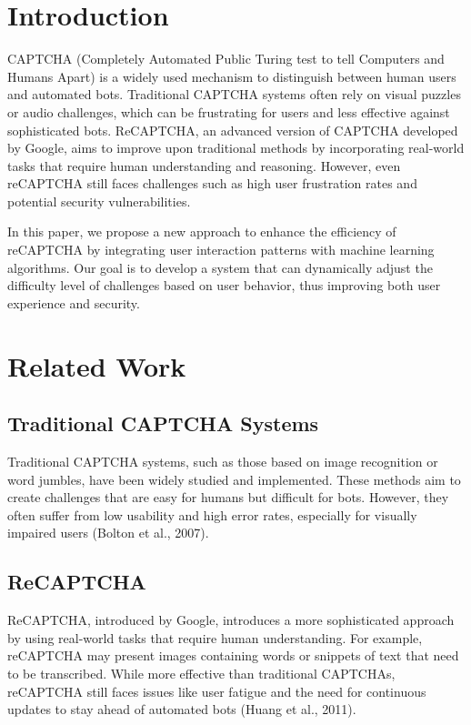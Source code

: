\section{Introduction}
\label{sec:introduction}
CAPTCHA (Completely Automated Public Turing test to tell Computers and Humans Apart) is a widely used mechanism to distinguish between human users and automated bots. Traditional CAPTCHA systems often rely on visual puzzles or audio challenges, which can be frustrating for users and less effective against sophisticated bots. ReCAPTCHA, an advanced version of CAPTCHA developed by Google, aims to improve upon traditional methods by incorporating real-world tasks that require human understanding and reasoning. However, even reCAPTCHA still faces challenges such as high user frustration rates and potential security vulnerabilities.

In this paper, we propose a new approach to enhance the efficiency of reCAPTCHA by integrating user interaction patterns with machine learning algorithms. Our goal is to develop a system that can dynamically adjust the difficulty level of challenges based on user behavior, thus improving both user experience and security.

\section{Related Work}
\label{sec:related_work}
\subsection{Traditional CAPTCHA Systems}
Traditional CAPTCHA systems, such as those based on image recognition or word jumbles, have been widely studied and implemented. These methods aim to create challenges that are easy for humans but difficult for bots. However, they often suffer from low usability and high error rates, especially for visually impaired users (Bolton et al., 2007).

\subsection{ReCAPTCHA}
ReCAPTCHA, introduced by Google, introduces a more sophisticated approach by using real-world tasks that require human understanding. For example, reCAPTCHA may present images containing words or snippets of text that need to be transcribed. While more effective than traditional CAPTCHAs, reCAPTCHA still faces issues like user fatigue and the need for continuous updates to stay ahead of automated bots (Huang et al., 2011).

